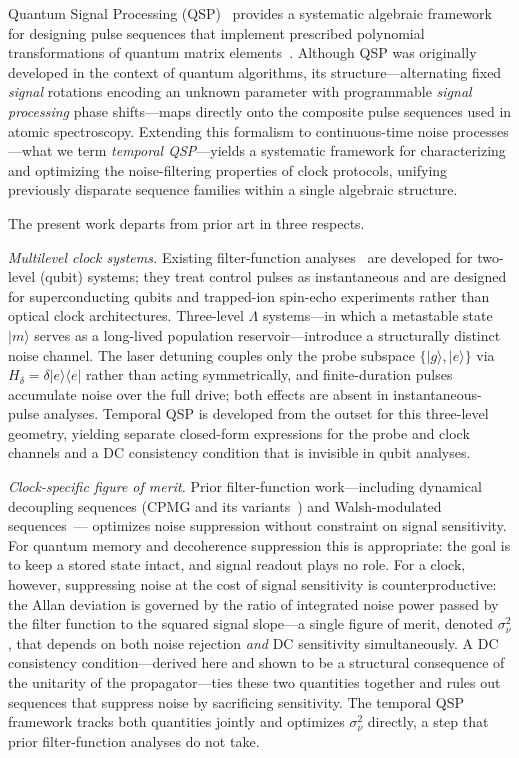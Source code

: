 \documentclass[aps,pra,twocolumn,superscriptaddress,longbibliography]{revtex4-2}
\begin{document}
Quantum Signal Processing (QSP)~\cite{LowChuang2017} provides a systematic algebraic
framework for designing pulse sequences that implement prescribed polynomial transformations
of quantum matrix elements~\cite{LowGMN2019,Gilyen2019}.
Although QSP was originally developed in the context of quantum algorithms, its
structure---alternating fixed \emph{signal} rotations encoding an unknown parameter
with programmable \emph{signal processing} phase shifts---maps directly onto the
composite pulse sequences used in atomic spectroscopy.
Extending this formalism to continuous-time noise processes---what we term
\emph{temporal QSP}---yields a systematic framework for characterizing and optimizing
the noise-filtering properties of clock protocols, unifying previously disparate
sequence families within a single algebraic structure.

The present work departs from prior art in three respects.

\textit{Multilevel clock systems.}
Existing filter-function analyses~\cite{Cywinski2008,Green2013,Soare2014} are developed
for two-level (qubit) systems; they treat control pulses as instantaneous and are
designed for superconducting qubits and trapped-ion spin-echo experiments rather than
optical clock architectures.
Three-level $\Lambda$ systems---in which a metastable state $|m\rangle$ serves as a
long-lived population reservoir---introduce a structurally distinct noise channel.
The laser detuning couples only the probe subspace $\{|g\rangle,|e\rangle\}$ via
$H_\delta = \delta|e\rangle\langle e|$ rather than acting symmetrically, and finite-duration
pulses accumulate noise over the full drive; both effects are absent in instantaneous-pulse
analyses.
Temporal QSP is developed from the outset for this three-level geometry, yielding
separate closed-form expressions for the probe and clock channels and a DC consistency
condition that is invisible in qubit analyses.

\textit{Clock-specific figure of merit.}
Prior filter-function work---including dynamical decoupling sequences (CPMG and its
variants~\cite{Cywinski2008,Biercuk2009,Bylander2011}) and Walsh-modulated sequences~\cite{Hayes2011,Magesan2011}---
optimizes noise suppression without constraint on signal sensitivity.
For quantum memory and decoherence suppression this is appropriate: the goal is to
keep a stored state intact, and signal readout plays no role.
For a clock, however, suppressing noise at the cost of signal sensitivity is
counterproductive: the Allan deviation is governed by the ratio of integrated noise
power passed by the filter function to the squared signal slope---a single figure of
merit, denoted $\sigma^2_\nu$, that depends on both noise rejection \emph{and} DC sensitivity simultaneously.
A DC consistency condition---derived here and shown to be a structural consequence of
the unitarity of the propagator---ties these two quantities together and rules out
sequences that suppress noise by sacrificing sensitivity.
The temporal QSP framework tracks both quantities jointly and optimizes $\sigma^2_\nu$
directly, a step that prior filter-function analyses do not take.
\end{document}
